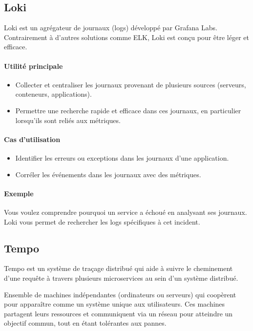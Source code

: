 \documentclass[french, 12pt]{article}%
\newcommand{\itemE}{\item[$\bullet$]}
\newcommand{\titreencadre}{Titre}
\newenvironment{encadre}[1]{\renewcommand{\titreencadre}{#1}
	\begin{mdframed}[style=encadrestyle]
	\vspace{0.5\baselineskip}
	}{%
	\end{mdframed}}
\begin{document}
\subsection{Loki}
Loki est un agrégateur de journaux (logs) développé par Grafana Labs. Contrairement à d'autres solutions comme ELK, Loki est conçu pour être léger et efficace.

\paragraph{Utilité principale}
\begin{itemize}
    \itemE Collecter et centraliser les journaux provenant de plusieurs sources (serveurs, conteneurs, applications).
    \itemE Permettre une recherche rapide et efficace dans ces journaux, en particulier lorsqu'ils sont reliés aux métriques.
\end{itemize}

\paragraph{Cas d'utilisation}
\begin{itemize}
    \itemE Identifier les erreurs ou exceptions dans les journaux d'une application.
    \itemE Corréler les événements dans les journaux avec des métriques.
\end{itemize}

\paragraph{Exemple}
Vous voulez comprendre pourquoi un service a échoué en analysant ses journaux. Loki vous permet de rechercher les logs spécifiques à cet incident.

\subsection{Tempo}
Tempo est un système de traçage distribué qui aide à suivre le cheminement d'une requête à travers plusieurs microservices au sein d'un système distribué.

\begin{encadre}{Système Distribué}
Ensemble de machines indépendantes (ordinateurs ou serveurs) qui coopèrent pour apparaître comme un système unique aux utilisateurs.  Ces machines partagent leurs ressources et communiquent via un réseau pour atteindre un objectif commun, tout en étant tolérantes aux pannes.
\end{encadre}
\end{document}
